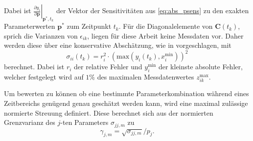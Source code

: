 Dabei ist $\left.\frac{\partial y_i}{\partial \pmb{p}}\right|_{\pmb{p}^*,t_k}$ der Vektor der Sensitivitäten aus \eqref{eq:abs_psens} zu den exakten Parameterwerten $\pmb{p}^*$ zum Zeitpunkt $t_k$. Für die Diagonalelemente von $\pmb{C}(t_k)$, sprich die Varianzen von $\epsilon_{ik}$, liegen für diese Arbeit keine Messdaten vor. Daher werden diese über eine konservative Abschätzung, wie in \cite{Majer.1998} vorgeschlagen, mit
\begin{equation}
\sigma_{ii}(t_k)=r_i^2\cdot\left(\mathrm{max}\left(y_i(t_k),x_i^\mathrm{min}\right)\right)^2
\end{equation}
berechnet. Dabei ist $r_i$ der relative Fehler und $y_i^\mathrm{min}$ der kleinste absolute Fehler, welcher festgelegt wird auf $1\%$ des maximalen Messdatenwertes $z^\mathrm{max}_{ik}$.

Um bewerten zu können ob eine bestimmte Parameterkombination während eines Zeitbereichs genügend genau geschätzt werden kann, wird eine maximal zulässige normierte Streuung definiert. Diese berechnet sich aus der normierten Grenzvarianz des $j$-ten Parameters $\sigma_{jj,m}$ zu 
\begin{equation}
\gamma_{j,m} = \sqrt{\sigma_{jj,m}}/p_j.
\end{equation}

